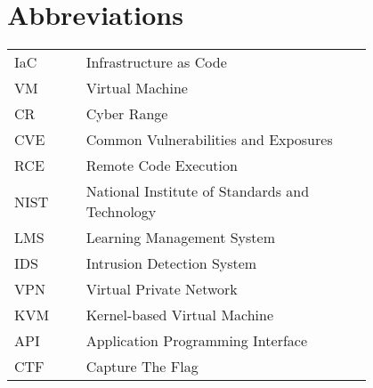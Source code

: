 \chapter*{Abbreviations}

\begin{flushleft}
\begin{tabular}{l p{0.8\linewidth}}
IaC      & Infrastructure as Code\\
VM       & Virtual Machine\\
CR       & Cyber Range\\
CVE      & Common Vulnerabilities and Exposures\\
RCE      & Remote Code Execution\\
NIST     & National Institute of Standards and Technology\\
LMS      & Learning Management System\\
IDS      & Intrusion Detection System\\
VPN      & Virtual Private Network\\
KVM      & Kernel-based Virtual Machine\\
API      & Application Programming Interface\\
CTF      & Capture The Flag\\
\end{tabular}
\end{flushleft}